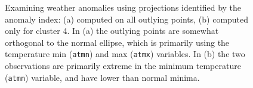 \documentclass[
  12pt]{article}
\begin{document}
\begin{figure}

\begin{minipage}{0.50\linewidth}



\end{minipage}%
%
\begin{minipage}{0.50\linewidth}



\end{minipage}%

\caption{\label{fig-weather}Examining weather anomalies using
projections identified by the anomaly index: (a) computed on all
outlying points, (b) computed only for cluster 4. In (a) the outlying
points are somewhat orthogonal to the normal ellipse, which is primarily
using the temperature min (\texttt{atmn}) and max (\texttt{atmx})
variables. In (b) the two observations are primarily extreme in the
minimum temperature (\texttt{atmn}) variable, and have lower than normal
minima.}

\end{figure}%
\end{document}

